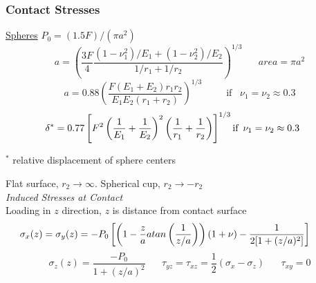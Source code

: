\documentclass[twocolumn, 12pt]{article}    %
\begin{document}
\subsubsection*{Contact Stresses}
\underline{Spheres} \hspace{125pt} \(P_0 = (1.5F)/(\pi a^2)\)\\
\begin{equation*}
    a = \left(\frac{3F}{4} \frac{(1-\nu_1^2)/E_1 + (1-\nu_2^2)/E_2 }{1/r_1 + 1/r_2} \right)^{1/3} \hspace{20pt} area = \pi a^2
\end{equation*}
\begin{equation*}
    a = 0.88 \left( \frac{F(E_1+E_2)r_1r_2}{ E_1E_2(r_1+ r_2)} \right)^{1/3} \hspace{30pt} \text{if} \hspace{10pt} \nu_1=\nu_2 \approx 0.3
\end{equation*}
\begin{equation*}
    \hspace{-15pt} \delta^* = 0.77 \left[ F^2 \left(\frac{1}{E_1} + \frac{1}{E_2} \right)^2 \left(\frac{1}{r_1} + \frac{1}{r_2} \right) \right]^{1/3}  \text{if} \hspace{5pt} \nu_1=\nu_2 \approx 0.3
\end{equation*}
\begin{center}
    \(^*\) relative displacement of sphere centers\\
\end{center}
\vspace{-10pt}
Flat surface, \(r_2 \rightarrow \infty\). Spherical cup, \( r_2 \rightarrow -r_2 \)\\
\textit{Induced Stresses at Contact}\\
Loading in \(z\) direction, \(z\) is distance from contact surface
\begin{equation*}
    \hspace{-30pt} \sigma_x(z) = \sigma_y(z) = -P_0 \left[ \left( 1 - \frac{z}{a} atan\left(  \frac{1}{z/a}\right) \right) (1+\nu) - \frac{1}{2[1 + (z/a)^2]} \right]
\end{equation*}
\begin{equation*}
    \sigma_z(z) = \frac{-P_0}{1+(z/a)^2} \hspace{20pt} \tau_{yz} = \tau_{xz} = \frac{1}{2}(\sigma_x - \sigma_z) \hspace{20pt} \tau_{xy} = 0
\end{equation*}
\end{document}
